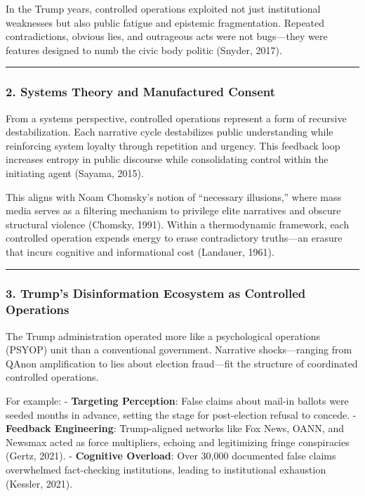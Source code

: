 In the Trump years, controlled operations exploited not just
institutional weaknesses but also public fatigue and epistemic
fragmentation. Repeated contradictions, obvious lies, and outrageous
acts were not bugs---they were features designed to numb the civic body
politic (Snyder, 2017).

\begin{center}\rule{0.5\linewidth}{0.5pt}\end{center}

\subsubsection{2. Systems Theory and Manufactured
Consent}\label{systems-theory-and-manufactured-consent}

From a systems perspective, controlled operations represent a form of
recursive destabilization. Each narrative cycle destabilizes public
understanding while reinforcing system loyalty through repetition and
urgency. This feedback loop increases entropy in public discourse while
consolidating control within the initiating agent (Sayama, 2015).

This aligns with Noam Chomsky's notion of ``necessary illusions,'' where
mass media serves as a filtering mechanism to privilege elite narratives
and obscure structural violence (Chomsky, 1991). Within a thermodynamic
framework, each controlled operation expends energy to erase
contradictory truths---an erasure that incurs cognitive and
informational cost (Landauer, 1961).

\begin{center}\rule{0.5\linewidth}{0.5pt}\end{center}

\subsubsection{3. Trump's Disinformation Ecosystem as Controlled
Operations}\label{trumps-disinformation-ecosystem-as-controlled-operations}

The Trump administration operated more like a psychological operations
(PSYOP) unit than a conventional government. Narrative shocks---ranging
from QAnon amplification to lies about election fraud---fit the
structure of coordinated controlled operations.

For example: - \textbf{Targeting Perception}: False claims about mail-in
ballots were seeded months in advance, setting the stage for
post-election refusal to concede. - \textbf{Feedback Engineering}:
Trump-aligned networks like Fox News, OANN, and Newsmax acted as force
multipliers, echoing and legitimizing fringe conspiracies (Gertz, 2021).
- \textbf{Cognitive Overload}: Over 30,000 documented false claims
overwhelmed fact-checking institutions, leading to institutional
exhaustion (Kessler, 2021).

